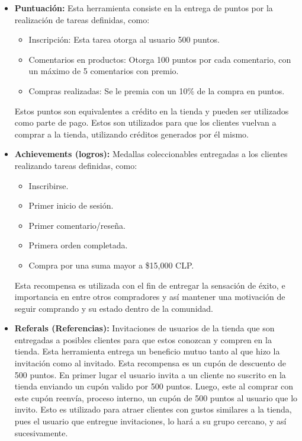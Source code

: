 \begin{itemize}
    \item {\bf Puntuación:}
        Esta herramienta consiste en la entrega de puntos por la realización
        de tareas definidas, como:

    \begin{itemize}
        \item Inscripción:
            Esta tarea otorga al usuario 500 puntos.
        \item Comentarios en productos:
            Otorga 100 puntos por cada comentario, con un máximo de 5 comentarios
            con premio.
        \item Compras realizadas:
            Se le premia con un 10\% de la compra en puntos.
    \end{itemize}

        Estos puntos son equivalentes a crédito en la tienda y pueden ser
        utilizados como parte de pago.
        Estos son utilizados para que los clientes vuelvan a comprar a la tienda,
        utilizando créditos generados por él mismo.

    \item {\bf Achievements (logros):}
        Medallas coleccionables entregadas a los clientes realizando tareas
        definidas, como:

        \begin{itemize}
            \item Inscribirse.
            \item Primer inicio de sesión.
            \item Primer comentario/reseña.
            \item Primera orden completada.
            \item Compra por una suma mayor a \$15,000 CLP.
        \end{itemize}

        Esta recompensa es utilizada con el fin de entregar la sensación de éxito,
        e importancia en entre otros compradores y así mantener una motivación
        de seguir comprando y su estado dentro de la comunidad.

    \item {\bf Referals (Referencias):}
        Invitaciones de usuarios de la tienda que son entregadas a posibles
        clientes para que estos conozcan y compren en la tienda.
        Esta herramienta entrega un beneficio mutuo tanto al que hizo la invitación
        como al invitado. Esta recompensa es un cupón de descuento de 500 puntos.
        En primer lugar el usuario invita a un cliente no suscrito en la tienda
        enviando un cupón valido por 500 puntos.
        Luego, este al comprar con este cupón reenvía,
        proceso interno, un cupón de 500 puntos al usuario que lo invito.
        Esto es utilizado para atraer clientes con gustos similares
        a la tienda, pues el usuario que entregue invitaciones, lo hará a su
        grupo cercano, y así sucesivamente.

\end{itemize}

